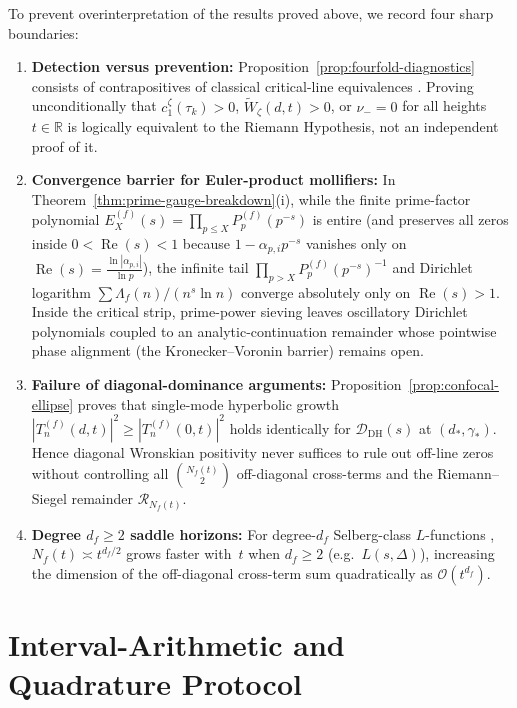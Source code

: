 \documentclass[11pt,reqno]{amsart}
\theoremstyle{definition}
\theoremstyle{remark}
\numberwithin{equation}{section}
\newcommand{\R}{\mathbb{R}}
\DeclareMathOperator{\Reop}{Re}
\begin{document}
To prevent overinterpretation of the results proved above, we record four sharp boundaries:
\begin{enumerate}[label=\textup{\arabic*.},leftmargin=2.2em]
  \item \textbf{Detection versus prevention:} Proposition~\ref{prop:fourfold-diagnostics} consists of contrapositives of classical critical-line equivalences \cite{hinkkanen1997,lagarias1999,debranges1968,ariasdereyna2003}. Proving unconditionally that $c_1^\zeta(\tau_k) > 0$, $\widetilde{W}_\zeta(d,t) > 0$, or $\nu_- = 0$ for all heights $t \in \R$ is logically equivalent to the Riemann Hypothesis, not an independent proof of it.
  \item \textbf{Convergence barrier for Euler-product mollifiers:} In Theorem~\ref{thm:prime-gauge-breakdown}(i), while the finite prime-factor polynomial $E_X^{(f)}(s) = \prod_{p\le X} P_p^{(f)}(p^{-s})$ is entire (and preserves all zeros inside $0 < \Reop(s) < 1$ because $1 - \alpha_{p,i}p^{-s}$ vanishes only on $\Reop(s) = \frac{\ln|\alpha_{p,i}|}{\ln p}$), the infinite tail $\prod_{p>X} P_p^{(f)}(p^{-s})^{-1}$ and Dirichlet logarithm $\sum \Lambda_f(n)/(n^s\ln n)$ converge absolutely only on $\Reop(s) > 1$. Inside the critical strip, prime-power sieving leaves oscillatory Dirichlet polynomials coupled to an analytic-continuation remainder whose pointwise phase alignment (the Kronecker--Voronin barrier) remains open.
  \item \textbf{Failure of diagonal-dominance arguments:} Proposition~\ref{prop:confocal-ellipse} proves that single-mode hyperbolic growth $|T_n^{(f)}(d,t)|^2 \ge |T_n^{(f)}(0,t)|^2$ holds identically for $\mathcal{D}_{\mathrm{DH}}(s)$ at $(d_*,\gamma_*)$. Hence diagonal Wronskian positivity never suffices to rule out off-line zeros without controlling all $\binom{N_f(t)}{2}$ off-diagonal cross-terms and the Riemann--Siegel remainder $\mathcal{R}_{N_f(t)}$.
  \item \textbf{Degree $d_f \ge 2$ saddle horizons:} For degree-$d_f$ Selberg-class $L$-functions \cite{selberg1992,kaczorowski1999}, $N_f(t) \asymp t^{d_f/2}$ grows faster with~$t$ when $d_f \ge 2$ (e.g.\ $L(s,\Delta)$), increasing the dimension of the off-diagonal cross-term sum quadratically as $\mathcal{O}(t^{d_f})$.
\end{enumerate}

\appendix

\section{Interval-Arithmetic and Quadrature Protocol}
\label{app:interval}
\end{document}

